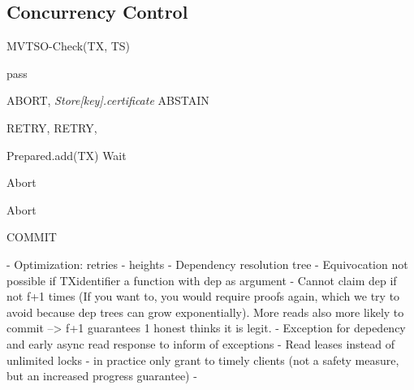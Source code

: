 \subsection{Concurrency Control}
\begin{algorithm}
\caption{MVTSO-Check(TX, TS)}\label{euclid}
\begin{algorithmic}[1]
\State pass
\EndIf

          \State  \Return ABORT, \textit{Store[key].certificate}
        \EndIf
          \State  \Return ABSTAIN
        \EndIf
        
        
        
\EndFor

          \State  \Return RETRY, %
        \EndIf
          \State  \Return RETRY, %
        \EndIf

\EndFor
\State Prepared.add(TX) 
\State Wait
\EndWhile

        	\State Abort
          	\EndIf
       
		\Else 
		\State Abort
		\EndIf
\EndFor


\State \Return COMMIT


\end{algorithmic}
\end{algorithm}


 - Optimization: retries - heights
 - Dependency resolution tree
 		- Equivocation not possible if TXidentifier a function with dep as argument
 		- Cannot claim dep if not f+1 times (If you want to, you would require proofs again, which we try to avoid because dep trees can grow exponentially). More reads also more likely to commit --> f+1 guarantees 1 honest thinks it is legit.
 - Exception for depedency and early async read response to inform of exceptions
 - Read leases instead of unlimited locks - in practice only grant to timely clients (not a safety measure, but an increased progress guarantee)
 - 
